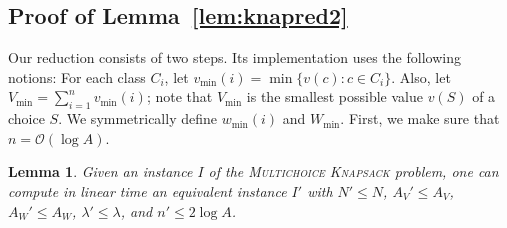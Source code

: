 \documentclass{article}
\theoremstyle{plain}
\newtheorem{lemma}[theorem]{Lemma}
\theoremstyle{definition}
\newcommand{\MK}{\textsc{Multichoice Knapsack}\xspace}
\newcommand{\Oh}{\mathcal{O}}
\begin{document}
  \subsection{Proof of Lemma~\ref{lem:knapred2}}\label{ss}
  Our reduction consists of two steps.   Its implementation uses the following notions:
  For each class $C_i$, let $v_{\min}(i) = \min\{v(c) : c\in C_i\}$. Also, let $V_{\min} = \sum_{i=1}^n v_{\min}(i)$; note that $V_{\min}$ is the smallest possible value $v(S)$ of a choice $S$.
  We symmetrically define $w_{\min}(i)$ and $W_{\min}$.
  First, we make sure that $n=\Oh(\log A)$.
  \begin{lemma}\label{lem:knapred}
    Given an instance $I$ of the \MK problem, one can compute in linear time an equivalent instance $I'$ with $N'\le N$, $A_V'\le A_V$, $A_W'\le A_W$, $\lambda'\le \lambda$, and $n' \le 2\log A$.
  \end{lemma}
\end{document}
